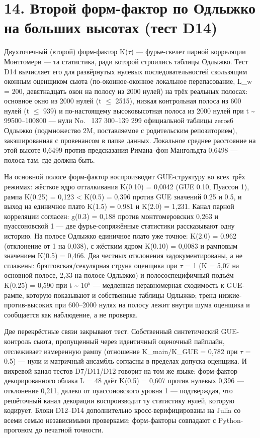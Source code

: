 \documentclass[11pt,a4paper]{article}
\begin{document}
\section{14. Второй форм-фактор по Одлыжко на больших высотах (тест D14)}
Двухточечный (второй) форм-фактор K($\tau$) --- фурье-скелет парной корреляции Монтгомери --- та статистика, ради которой строились таблицы Одлыжко. Тест D14 вычисляет его для развёрнутых нулевых последовательностей скользящим оконным оценщиком сьюта (по-оконное-оконное локальное перепасование, L\_\allowbreak{}w = 200, девятнадцать окон на полосу из 2000 нулей) на трёх реальных полосах: основное окно из 2000 нулей (t $\le$ 2515), низкая контрольная полоса из 600 нулей (t $\le$ 939) и по-настоящему высоковысотная полоса из 2000 нулей при t \textasciitilde{} 99500--100800 --- нули No.~ 137 300--139 299 официальной таблицы zeros6 Одлыжко (подмножество 2M, поставляемое с родительским репозиторием), закэшированная с провенансом в папке данных. Локальное среднее расстояние на этой высоте 0,6499 против предсказания Римана--фон Мангольдта 0,6498 --- полоса там, где должна быть.

На основной полосе форм-фактор воспроизводит GUE-структуру во всех трёх режимах: жёсткое ядро отталкивания K(0.10) = 0,0042 (GUE 0.10, Пуассон 1), рампа K(0.25) = 0,123 < K(0.5) = 0,396 против GUE значений 0.25 и 0.5, и выход на единичное плато K(1.5) = 0,981 и K(2.0) = 1,231. Канал парной корреляции согласен: g(0.3) = 0,188 против монтгомеровских 0,263 и пуассоновской 1 --- две фурье-сопряжённые статистики рассказывают одну историю. На полосе Одлыжко единичное плато уже точное: K(2.0) = 0,962 (отклонение от 1 на 0,038), с жёстким ядром K(0.10) = 0,0083 и рамповым значением K(0.5) = 0,466. Два честных отклонения задокументированы, а не сглажены: брэгговская/секулярная струна оценщика при $\tau$ = 1 (K = 5,07 на основной полосе, 2,33 на полосе Одлыжко) и полососпецифичный подъём K(0.25) = 0,590 при t \textasciitilde{} 10$^{5}$ --- медленная неравномерная сходимость к GUE-рампе, которую показывают и собственные таблицы Одлыжко; тренд низкие-против-высоких при 600--2000 нулях на полосу лежит внутри шума оценщика и сообщается как наблюдение, а не проверка.

Две перекрёстные связи закрывают тест. Собственный синтетический GUE-контроль сьюта, пропущенный через идентичный оценочный пайплайн, отслеживает измеренную рампу (отношение K\_\allowbreak{}main/K\_\allowbreak{}GUE = 0,782 при $\tau$ = 0.5) --- нули и матричный ансамбль согласны в пределах допуска оценщика. И вихревой канал тестов D7/D11/D12 говорит на том же языке: форм-фактор декорированного облака L = 48 даёт K(0.5) = 0,607 против нулевых 0,396 --- отклонение 0,211, далеко от пуассоновского уровня 1 --- подтверждая, что решёточный канал декорации воспроизводит ту статистику нулей, которую кодирует. Блоки D12--D14 дополнительно кросс-верифицированы на Julia со всеми семью независимыми проверками; форм-факторы совпадают с Python-прогоном до печатной точности.
\end{document}
